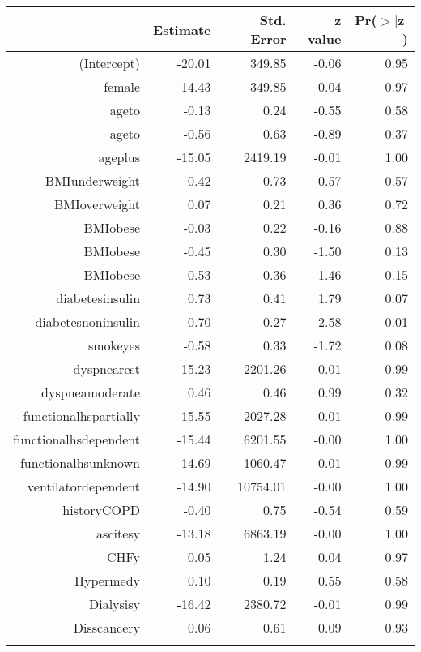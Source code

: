 \bigskip\bigskip
\centering
\begin{tabular}{rrrrr}
  \hline
 & Estimate & Std. Error & z value & Pr($>$$|$z$|$) \\ 
  \hline
(Intercept) & -20.01 & 349.85 & -0.06 & 0.95 \\ 
  female & 14.43 & 349.85 & 0.04 & 0.97 \\ 
  age\-65\-to\-74 & -0.13 & 0.24 & -0.55 & 0.58 \\ 
  age\-75\-to\-84 & -0.56 & 0.63 & -0.89 & 0.37 \\ 
  age\-85\-plus & -15.05 & 2419.19 & -0.01 & 1.00 \\ 
  BMI\-underweight & 0.42 & 0.73 & 0.57 & 0.57 \\ 
  BMI\-overweight & 0.07 & 0.21 & 0.36 & 0.72 \\ 
  BMI\-obese\-1 & -0.03 & 0.22 & -0.16 & 0.88 \\ 
  BMI\-obese\-2 & -0.45 & 0.30 & -1.50 & 0.13 \\ 
  BMI\-obese\-3 & -0.53 & 0.36 & -1.46 & 0.15 \\ 
  diabetes\-insulin & 0.73 & 0.41 & 1.79 & 0.07 \\ 
  diabetes\-noninsulin & 0.70 & 0.27 & 2.58 & 0.01 \\ 
  smoke\-yes & -0.58 & 0.33 & -1.72 & 0.08 \\ 
  dyspnea\-rest & -15.23 & 2201.26 & -0.01 & 0.99 \\ 
  dyspnea\-moderate & 0.46 & 0.46 & 0.99 & 0.32 \\ 
  functional\-hs\-partially & -15.55 & 2027.28 & -0.01 & 0.99 \\ 
  functional\-hs\-dependent & -15.44 & 6201.55 & -0.00 & 1.00 \\ 
  functional\-hs\-unknown & -14.69 & 1060.47 & -0.01 & 0.99 \\ 
  ventilator\-dependent & -14.90 & 10754.01 & -0.00 & 1.00 \\ 
  history\-COPD & -0.40 & 0.75 & -0.54 & 0.59 \\ 
  ascites\-y & -13.18 & 6863.19 & -0.00 & 1.00 \\ 
  CHF\-y & 0.05 & 1.24 & 0.04 & 0.97 \\ 
  Hyper\-med\-y & 0.10 & 0.19 & 0.55 & 0.58 \\ 
  Dialysis\-y & -16.42 & 2380.72 & -0.01 & 0.99 \\ 
  Diss\-cancer\-y & 0.06 & 0.61 & 0.09 & 0.93 \\ 
$$
\end{tabular}
